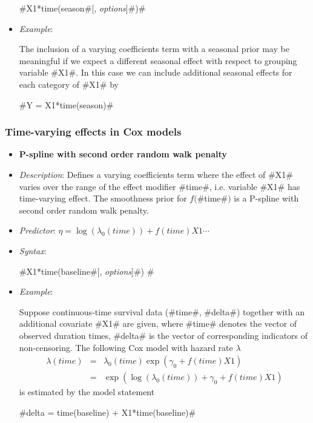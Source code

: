\begin{itemize}
#X1*time(season#[, {\em options}]#)#
\item[] {\em Example}:

The inclusion of a varying coefficients term with a seasonal prior
may be meaningful if we expect a different seasonal effect with
respect to grouping variable #X1#. In this case we can include
additional seasonal effects for each category of #X1# by

#Y = X1*time(season)#

\end{itemize}

\subsubsection*{Time-varying effects in Cox models}

\begin{itemize}
\item[]{\bf\sffamily P-spline with second order random walk
penalty}

\item[] {\em Description}: Defines a varying coefficients term
where the effect of #X1# varies over the range of the effect
modifier #time#, i.e. variable #X1# has time-varying effect. The
smoothness prior for $f($#time#$)$ is a P-spline with second order
random walk penalty.

 \item[] {\em Predictor}: $\eta = \log(\lambda_0(time)) +
f(time)X1 \cdots$ \item[] {\em Syntax}:

 #X1*time(baseline#[, {\em options}]#) #
 \item[] {\em Example}:

Suppose continuous-time survival data (#time#, #delta#) together
with an additional covariate #X1# are given, where #time# denotes
the vector of observed duration times, #delta# is the vector of
corresponding indicators of non-censoring. The following Cox model
with hazard rate $\lambda$
\begin{eqnarray*}
 \lambda(time) & = & \lambda_0(time)\exp(\gamma_0 + f(time)X1)\\
 & = & \exp\left(\log(\lambda_0(time)) + \gamma_0 + f(time)X1\right)
\end{eqnarray*}
is estimated by the model statement

#delta = time(baseline) + X1*time(baseline)#

\end{itemize}

